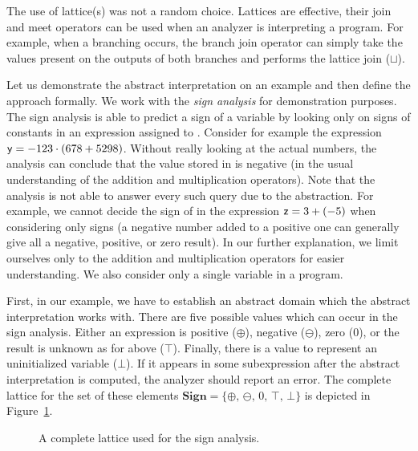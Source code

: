 The use of lattice(s) was not a random choice. Lattices are effective, their
join and meet operators can be used when an analyzer is interpreting a
program.  For example, when a branching occurs, the branch join operator can
simply take the values present on the outputs of both branches and performs
the lattice join ($\sqcup$).

Let us demonstrate the abstract interpretation on an example and then define
the approach formally.  We work with the \emph{sign analysis} for
demonstration purposes.  The sign analysis is able to predict a sign of a
variable  by looking only on signs of constants in an expression
assigned to .  Consider for example the expression $\mathsf{y} = -123
\cdot (678 + 5298)$.  Without really looking at the actual numbers, the
analysis can conclude that the value stored in  is negative (in the
usual understanding of the addition and multiplication operators). Note that
the analysis is not able to answer every such query due to the abstraction.
For example, we cannot decide the sign of  in the expression $\mathsf{z}
= 3 + (-5)$ when considering only signs (a negative number added to a positive
one can generally give all a negative, positive, or zero result). In our
further explanation, we limit ourselves only to the addition and
multiplication operators for easier understanding. We also consider only a
single variable in a program.

First, in our example, we have to establish an abstract domain which the
abstract interpretation works with. There are five possible values which can
occur in the sign analysis.  Either an expression is positive ($\oplus$),
negative ($\ominus$), zero ($0$), or the result is unknown as for 
above ($\top$). Finally, there is a value to represent an uninitialized
variable ($\bot$). If it appears in some subexpression after the abstract
interpretation is computed, the analyzer should report an error.  The complete
lattice for the set of these elements $\mathbf{Sign} = \{\oplus,\, \ominus,\,
0,\, \top,\, \bot \}$ is depicted in Figure~\ref{fig:state_ai_sign_lat}.
\begin{figure}[htb]
  \begin{center}
  \end{center}
  \caption{A complete lattice used for the sign analysis.}
  \label{fig:state_ai_sign_lat}
\end{figure}

